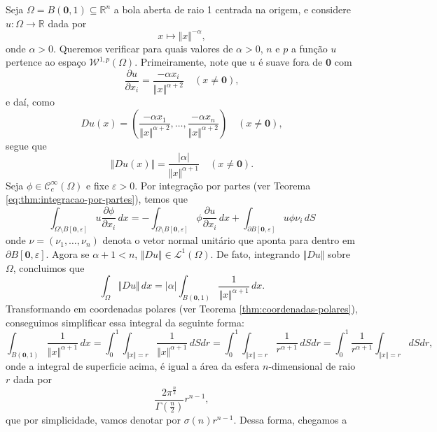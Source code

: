 \documentclass[a4paper, 11pt]{book}
\theoremstyle{definition}
\newcommand{\bR}{\mathbb{R}}
\newcommand{\cC}{\mathcal{C}}
\newcommand{\cL}{\mathcal{L}}
\newcommand{\cW}{\mathcal{W}}
\begin{document}
\begin{ex}
    Seja $\Omega = B(\mathbf{0},1) \subseteq \bR^n$ a bola aberta de raio 1 centrada na origem, e considere $u : \Omega \to \bR$ dada por
    \begin{equation} \label{eq:po}
        x \mapsto \Vert x \Vert^{-\alpha},
    \end{equation}
    onde $\alpha > 0$. Queremos verificar para quais valores de $\alpha > 0$, $n$ e $p$ a função $u$ pertence ao espaço $\cW^{1,p}(\Omega)$.
    Primeiramente, note que $u$ é suave fora de $\mathbf{0}$ com
    \[
        \dfrac{\partial u}{\partial x_i} = \frac{-\alpha x_i}{\Vert x \Vert^{\alpha + 2}} \quad (x \neq \mathbf{0}),
    \]
    e daí, como
    \[
        Du(x) = \left(\frac{-\alpha x_1}{\Vert x \Vert^{\alpha + 2}},\dots,\frac{-\alpha x_n}{\Vert x \Vert^{\alpha + 2}}  \right) \quad (x \neq \mathbf{0}),
    \]
    segue que
    \[
        \Vert Du(x) \Vert = \frac{|\alpha|}{\Vert x \Vert^{\alpha + 1}} \quad (x \neq \mathbf{0}).
    \]
    Seja $\phi \in \cC^\infty_c(\Omega)$ e fixe $\varepsilon > 0$. Por integração por partes (ver Teorema \ref{eq:thm:integracao-por-partes}), temos que
    \begin{equation} \label{eq:op}
        \int_{\Omega \setminus B[\mathbf{0}, \varepsilon]} u \dfrac{\partial \phi}{\partial x_i} \, dx = -\int_{\Omega \setminus B[\mathbf{0}, \varepsilon]} \phi \dfrac{\partial u}{\partial x_i} \,dx + \int_{\partial B[\mathbf{0},\varepsilon]} u \phi \nu_i \,dS
    \end{equation}
    onde $\nu = (\nu_1,\dots,\nu_n)$ denota o vetor normal unitário que aponta para dentro em $\partial B[\mathbf{0},\varepsilon]$.
    Agora se $\alpha + 1 < n$, $\Vert Du \Vert \in \cL^1(\Omega)$.
    De fato, integrando $\Vert Du \Vert$ sobre $\Omega$, concluimos que
    \[
        \int_\Omega \Vert Du \Vert \,dx = |\alpha|\int_{B(\mathbf{0},1)} \frac{1}{\Vert x \Vert^{\alpha+1}} \,dx.
    \]
    Transformando em coordenadas polares (ver Teorema \ref{thm:coordenadas-polares}), conseguimos simplificar essa integral da seguinte forma:
    \[
        \int_{B(\mathbf{0},1)} \frac{1}{\Vert x \Vert^{\alpha+1}} \,dx =  \int_0^1 \int_{\Vert x \Vert = r} \frac{1}{\Vert x \Vert^{\alpha + 1}} \,dS dr = \int_0^1 \int_{\Vert x \Vert= r} \frac{1}{r^{\alpha + 1}} \, dS dr = \int_0^1 \frac{1}{r^{\alpha+1}}  \int_{\Vert x \Vert = r} dS dr,
    \]
    onde a integral de superficie acima, é igual a área da esfera $n$-dimensional de raio $r$ dada por
    \[
        \frac{2\pi^{\frac{n}{2}}}{\Gamma(\frac{n}{2})}r^{n-1},
    \]
    que por simplicidade, vamos denotar por $\sigma(n) r^{n-1}$. Dessa forma, chegamos a

\end{ex}
\end{document}
